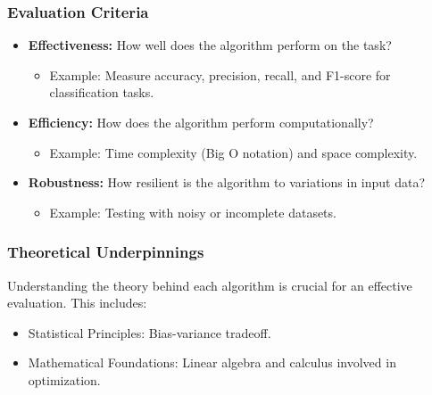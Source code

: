 \documentclass[aspectratio=169]{beamer}
\begin{document}
\begin{frame}[fragile]
    \frametitle{Evaluation Criteria}
    
    \begin{itemize}
        \item \textbf{Effectiveness:} How well does the algorithm perform on the task?
        \begin{itemize}
            \item Example: Measure accuracy, precision, recall, and F1-score for classification tasks.
        \end{itemize}
        
        \item \textbf{Efficiency:} How does the algorithm perform computationally?
        \begin{itemize}
            \item Example: Time complexity (Big O notation) and space complexity.
        \end{itemize}
        
        \item \textbf{Robustness:} How resilient is the algorithm to variations in input data?
        \begin{itemize}
            \item Example: Testing with noisy or incomplete datasets.
        \end{itemize}
    \end{itemize}
\end{frame}

\begin{frame}[fragile]
    \frametitle{Theoretical Underpinnings}
    
    Understanding the theory behind each algorithm is crucial for an effective evaluation. This includes:
    
    \begin{itemize}
        \item Statistical Principles: Bias-variance tradeoff.
        \item Mathematical Foundations: Linear algebra and calculus involved in optimization.
    \end{itemize}
\end{frame}
\end{document}
